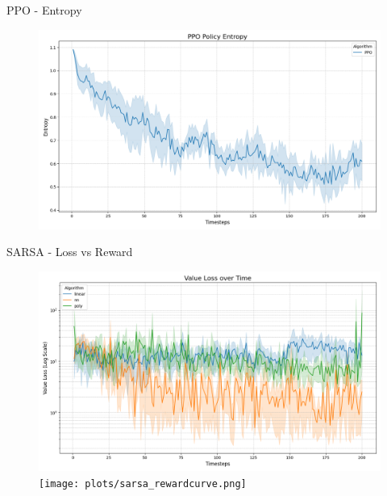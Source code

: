 \documentclass[serif]{beamer}  %
\begin{document}
\begin{frame}{PPO - Entropy}
    \begin{figure}
        \centering
        \includegraphics[width=\linewidth]{plots/ppo_entropy_curve.png}
    \end{figure}
\end{frame}

\begin{frame}{SARSA - Loss vs Reward}
    \begin{figure}
        \centering
        \includegraphics[width=\linewidth]{plots/sarsa_value_loss_curve.png}
        \texttt{[image: plots/sarsa\_rewardcurve.png]}
    \end{figure}
\end{frame}
\end{document}
